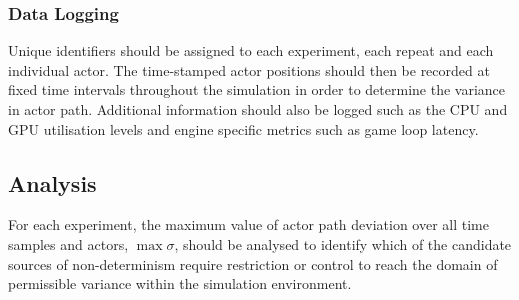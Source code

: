 \documentclass[letterpaper, 10 pt, journal, twoside]{IEEEtran}
\begin{document}

\subsubsection{Data Logging}
Unique identifiers should be assigned to each experiment, each repeat and each individual actor. 
The time-stamped actor positions should then be recorded at fixed time intervals throughout the simulation in order to determine the variance in actor path. Additional information should also be logged such as the CPU and GPU utilisation levels and engine specific metrics such as game loop latency.

\subsection{Analysis}
For each experiment, the maximum value of actor path deviation over all time samples and actors, $\max\sigma$, should be analysed to identify which of the candidate sources of non-determinism require restriction or control to reach the domain of permissible variance within the simulation environment. 


\end{document}
